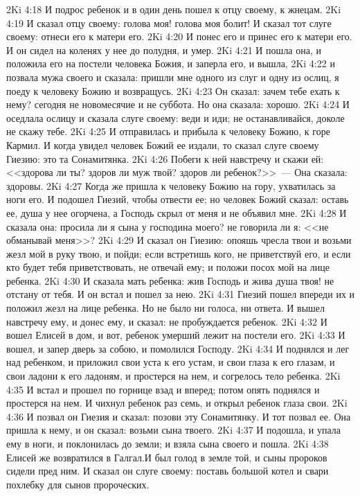 \vs 2Ki 4:18 И подрос ребенок и в один день пошел к отцу своему, к жнецам.
\vs 2Ki 4:19 И сказал отцу своему: голова моя! голова моя болит! И сказал тот слуге своему: отнеси его к матери его.
\vs 2Ki 4:20 И понес его и принес его к матери его. И он сидел на коленях у нее до полудня, и умер.
\vs 2Ki 4:21 И пошла она, и положила его на постели человека Божия, и заперла его, и вышла,
\vs 2Ki 4:22 и позвала мужа своего и сказала: пришли мне одного из слуг и одну из ослиц, я поеду к человеку Божию и возвращусь.
\vs 2Ki 4:23 Он сказал: зачем тебе ехать к нему? сегодня не новомесячие и не суббота. Но она сказала: хорошо.
\vs 2Ki 4:24 И оседлала ослицу и сказала слуге своему: веди и иди; не останавливайся, доколе не скажу тебе.
\vs 2Ki 4:25 И отправилась и прибыла к человеку Божию, к горе Кармил. И когда увидел человек Божий ее издали, то сказал слуге своему Гиезию: это та Сонамитянка.
\vs 2Ki 4:26 Побеги к ней навстречу и скажи ей: <<здорова ли ты? здоров ли муж твой? здоров ли ребенок?>>~--- Она сказала: здоровы.
\vs 2Ki 4:27 Когда же пришла к человеку Божию на гору, ухватилась за ноги его. И подошел Гиезий, чтобы отвести ее; но человек Божий сказал: оставь ее, душа у нее огорчена, а Господь скрыл от меня и не объявил мне.
\vs 2Ki 4:28 И сказала она: просила ли я сына у господина моего? не говорила ли я: <<не обманывай меня>>?
\vs 2Ki 4:29 И сказал он Гиезию: опояшь чресла твои и возьми жезл мой в руку твою, и пойди; если встретишь кого, не приветствуй его, и если кто будет тебя приветствовать, не отвечай ему; и положи посох мой на лице ребенка.
\vs 2Ki 4:30 И сказала мать ребенка: жив Господь и жива душа твоя! не отстану от тебя. И он встал и пошел за нею.
\vs 2Ki 4:31 Гиезий пошел впереди их и положил жезл на лице ребенка. Но не было ни голоса, ни ответа. И вышел навстречу ему, и донес ему, и сказал: не пробуждается ребенок.
\vs 2Ki 4:32 И вошел Елисей в дом, и вот, ребенок умерший лежит на постели его.
\vs 2Ki 4:33 И вошел, и запер дверь за собою, и помолился Господу.
\vs 2Ki 4:34 И поднялся и лег над ребенком, и приложил свои уста к его устам, и свои глаза к его глазам, и свои ладони к его ладоням, и простерся на нем, и согрелось тело ребенка.
\vs 2Ki 4:35 И встал и прошел по горнице взад и вперед; потом опять поднялся и простерся на нем. И чихнул ребенок раз семь, и открыл ребенок глаза свои.
\vs 2Ki 4:36 И позвал он Гиезия и сказал: позови эту Сонамитянку. И тот позвал ее. Она пришла к нему, и он сказал: возьми сына твоего.
\vs 2Ki 4:37 И подошла, и упала ему в ноги, и поклонилась до земли; и взяла сына своего и пошла.
\vs 2Ki 4:38 Елисей же возвратился в Галгал.\rsbpar И был голод в земле той, и сыны пророков сидели пред ним. И сказал он слуге своему: поставь большой котел и свари похлебку для сынов пророческих.
